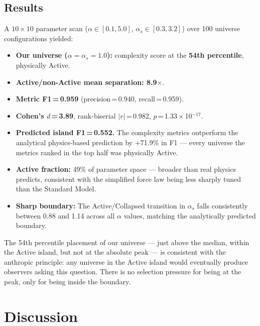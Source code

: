 \documentclass[12pt,a4paper]{article}
\begin{document}
\subsection{Results}

A $10 \times 10$ parameter scan ($\alpha \in [0.1, 5.0]$,
$\alpha_s \in [0.3, 3.2]$) over 100 universe configurations yielded:

\begin{itemize}[noitemsep]
  \item \textbf{Our universe ($\alpha = \alpha_s = 1.0$):}
    complexity score at the \textbf{54th percentile}, physically Active.
  \item \textbf{Active/non-Active mean separation: 8.9$\times$}.
  \item \textbf{Metric F1\,=\,0.959}
    (precision\,=\,0.940, recall\,=\,0.959).
  \item \textbf{Cohen's $d$\,=\,3.89}, rank-biserial $|r|$\,=\,0.982,
    $p$\,=\,1.33\,×\,10$^{-17}$.
  \item \textbf{Predicted island F1\,=\,0.552.}
    The complexity metrics outperform the analytical physics-based
    prediction by $+$71.9\% in F1 — every universe the metrics ranked
    in the top half was physically Active.
  \item \textbf{Active fraction:} 49\% of parameter space —
    broader than real physics predicts, consistent with the simplified
    force law being less sharply tuned than the Standard Model.
  \item \textbf{Sharp boundary:} The Active/Collapsed transition in
    $\alpha_s$ falls consistently between 0.88 and 1.14 across all
    $\alpha$ values, matching the analytically predicted boundary.
\end{itemize}

The 54th percentile placement of our universe — just above the median,
within the Active island, but not at the absolute peak — is consistent
with the anthropic principle: any universe in the Active island would
eventually produce observers asking this question.
There is no selection pressure for being at the peak, only for being
inside the boundary.

\section{Discussion}
\label{sec:discussion}
\end{document}
